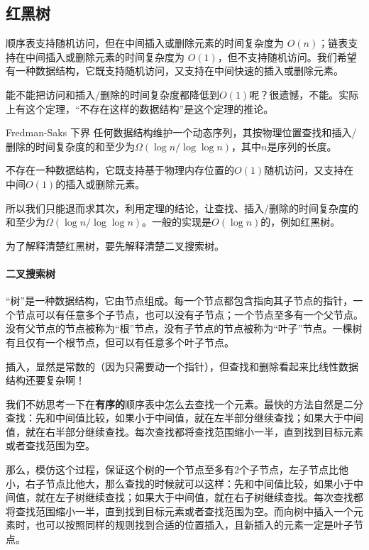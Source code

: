 \subsection{红黑树}

顺序表支持随机访问，但在中间插入或删除元素的时间复杂度为 $O(n)$；链表支持在中间插入或删除元素的时间复杂度为 $O(1)$，但不支持随机访问。我们希望有一种数据结构，它既支持随机访问，又支持在中间快速的插入或删除元素。

能不能把访问和插入/删除的时间复杂度都降低到$O(1)$呢？很遗憾，不能。实际上有这个定理，“不存在这样的数据结构”是这个定理的推论。
\begin{theorem}{Fredman-Saks 下界}{}
    任何数据结构维护一个动态序列，其按物理位置查找和插入/删除的时间复杂度的和至少为$\Omega(\log n / \log \log n)$，其中$n$是序列的长度。
\end{theorem}

\begin{corollary}{}{}
    不存在一种数据结构，它既支持基于物理内存位置的$O(1)$随机访问，又支持在中间$O(1)$的插入或删除元素。
\end{corollary}

所以我们只能退而求其次，利用定理的结论，让查找、插入/删除的时间复杂度的和至少为$\Omega(\log n / \log \log n)$。一般的实现是$O(\log n)$的，例如红黑树。

为了解释清楚红黑树，要先解释清楚二叉搜索树。

\paragraph{二叉搜索树} “树”是一种数据结构，它由节点组成。每一个节点都包含指向其子节点的指针，一个节点可以有任意多个子节点，也可以没有子节点；一个节点至多有一个父节点。没有父节点的节点被称为“根”节点，没有子节点的节点被称为“叶子”节点。一棵树有且仅有一个根节点，但可以有任意多个叶子节点。

插入，显然是常数的（因为只需要动一个指针），但查找和删除看起来比线性数据结构还要复杂啊！

我们不妨思考一下在\textbf{有序的}顺序表中怎么去查找一个元素。最快的方法自然是二分查找：先和中间值比较，如果小于中间值，就在左半部分继续查找；如果大于中间值，就在右半部分继续查找。每次查找都将查找范围缩小一半，直到找到目标元素或者查找范围为空。

那么，模仿这个过程，保证这个树的一个节点至多有2个子节点，左子节点比他小，右子节点比他大，那么查找的时候就可以这样：先和中间值比较，如果小于中间值，就在左子树继续查找；如果大于中间值，就在右子树继续查找。每次查找都将查找范围缩小一半，直到找到目标元素或者查找范围为空。而向树中插入一个元素时，也可以按照同样的规则找到合适的位置插入，且新插入的元素一定是叶子节点。

